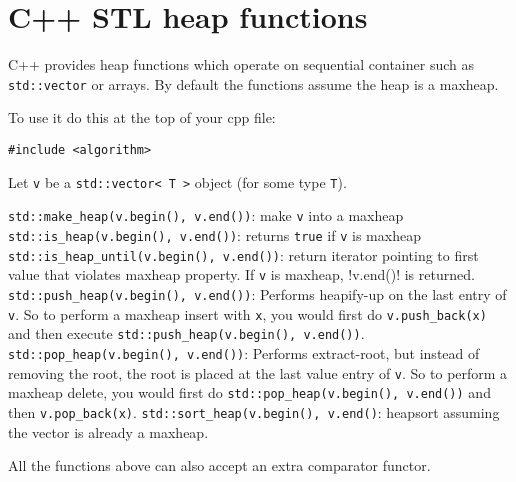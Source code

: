 \section{C++ STL heap functions}

C++ provides heap functions
which operate on sequential container such as \verb!std::vector!
or arrays.
By default the functions assume the heap is a maxheap.

To use it do this at the top of your cpp file:
\begin{Verbatim}[frame=single, fontsize=\small]
#include <algorithm>
\end{Verbatim}

Let \verb!v! be a \verb!std::vector< T >! object (for some type \verb!T!).
\begin{enumerate}[nosep]
  \li \verb!std::make_heap(v.begin(), v.end())!: make \verb!v! into a maxheap
  \li \verb!std::is_heap(v.begin(), v.end())!: returns \verb!true! if \verb!v! is maxheap
  \li \verb!std::is_heap_until(v.begin(), v.end())!:
  return iterator pointing to first value that violates maxheap property.
  If \verb!v! is maxheap, !v.end()! is returned.
  \li \verb!std::push_heap(v.begin(), v.end())!: Performs heapify-up on
  the last entry of \verb!v!.
  So to perform a maxheap insert with \verb!x!, you would first
  do \verb!v.push_back(x)! and then execute
  \verb!std::push_heap(v.begin(), v.end())!.
  \li \verb!std::pop_heap(v.begin(), v.end())!: Performs extract-root,
  but instead of removing the root,
  the root is placed at the last value entry of \verb!v!.
  So to perform a maxheap delete, you would first
  do \verb!std::pop_heap(v.begin(), v.end())!
  and then \verb!v.pop_back(x)!.
  \li \verb!std::sort_heap(v.begin(), v.end()!: heapsort assuming the
  vector is already a maxheap.
\end{enumerate}
All the functions above can also accept an extra comparator functor.
